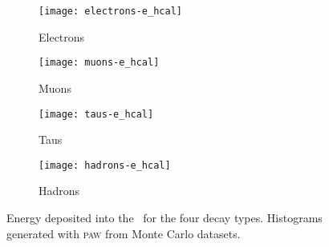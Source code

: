 \begin{figure}
    \centering
    \begin{subfigure}[c]{0.48\linewidth}
        \centering
        \texttt{[image: electrons-e\_hcal]}
        \caption{%
            Electrons
        }
        \label{fig:paw-e_hcal/electrons}
    \end{subfigure}
    \hfill
    \begin{subfigure}[c]{0.48\linewidth}
        \centering
        \texttt{[image: muons-e\_hcal]}
        \caption{%
            Muons
        }
        \label{fig:paw-e_hcal/muons}
    \end{subfigure}

    \vspace{2ex}

    \begin{subfigure}[c]{0.48\linewidth}
        \centering
        \texttt{[image: taus-e\_hcal]}
        \caption{%
            Taus
        }
        \label{fig:paw-e_hcal/taus}
    \end{subfigure}
    \hfill
    \begin{subfigure}[c]{0.48\linewidth}
        \centering
        \texttt{[image: hadrons-e\_hcal]}
        \caption{%
            Hadrons
        }
        \label{fig:paw-e_hcal/hadrons}
    \end{subfigure}
    \caption{%
        Energy deposited into the \ehcal\ for the four decay types.
        Histograms generated with \textsc{paw} from Monte Carlo datasets.
    }
    \label{fig:paw-e_hcal}
\end{figure}
